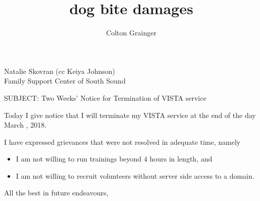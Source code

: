 \documentclass{letter}
\title{dog bite damages}
\begin{document}
\begin{letter}{Natalie Skovran (cc Keiya Johnson)\\Family Support Center of South Sound}

\opening{SUBJECT: Two Weeks' Notice for Termination of VISTA service}

Today I give notice that I will terminate my VISTA service at the end of the day March , 2018.

I have expressed grievances that were not resolved in adequate time, namely
\begin{itemize}
\item I am not willing to run trainings beyond $4$ hours in length, and
\item I am not willing to recruit volunteers without server side access to a  domain.
\end{itemize}

\closing{All the best in future endeavours,}
\signature{Colton Grainger}
\end{letter}
\end{document}
